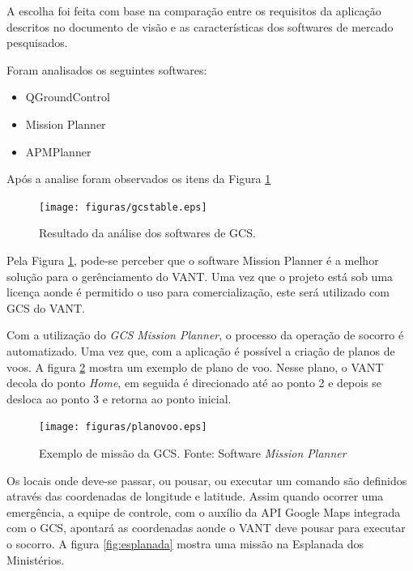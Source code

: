 A escolha foi feita com base na comparação entre os requisitos da aplicação descritos no documento de visão e as características dos softwares de mercado pesquisados.

Foram analisados os seguintes softwares: 

\begin{itemize}
  \item QGroundControl
  \item Mission Planner
  \item APMPlanner
\end{itemize}

Após a analise foram observados os itens da Figura \ref{fig:gcstable}

\pagebreak

\begin{figure}[H]
    \centering
      \texttt{[image: figuras/gcstable.eps]}
    \caption{Resultado da análise dos softwares de GCS.}
    \label{fig:gcstable}
\end{figure}

Pela Figura \ref{fig:gcstable}, pode-se perceber que o software Mission Planner é a melhor solução para o gerênciamento do VANT. Uma vez que o projeto está sob uma licença aonde é permitido o uso para comercialização, este será utilizado com GCS do VANT.

Com a utilização do \textit{GCS Mission Planner}, o processo da operação de socorro é automatizado. 
Uma vez que, com a aplicação é possível a criação de planos de voos. 
A figura \ref{fig:planovoo} mostra um exemplo de plano de voo. 
Nesse plano, o VANT decola do ponto \textit{Home}, em seguida é direcionado até ao ponto 2 e depois 
se desloca ao ponto 3 e retorna ao ponto inicial.

\begin{figure}[H]
    \centering
	    \texttt{[image: figuras/planovoo.eps]}
    \caption{Exemplo de missão da GCS. Fonte: Software \textit{Mission Planner}}
    \label{fig:planovoo}
\end{figure}


Os locais onde deve-se passar, ou pousar, ou executar um comando são definidos através das coordenadas de longitude e latitude. Assim quando ocorrer uma emergência, a equipe de controle, com o auxílio da API Google Maps integrada com o GCS, apontará as coordenadas aonde o VANT deve pousar para executar o socorro. 
A figura \ref{fig:esplanada} mostra uma missão na Esplanada dos Ministérios.

